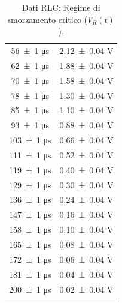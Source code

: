 \documentclass[a4paper]{article}
\begin{document}
\begin{appendices}
\begin{table}[htbp]
\begin{tabular}{|c|c|}
    \num{56 \pm 1} \si{\micro\second} & \num{2.12 \pm 0.04} \si{\volt} \\
    \num{62 \pm 1} \si{\micro\second} & \num{1.88 \pm 0.04} \si{\volt} \\
    \num{70 \pm 1} \si{\micro\second} & \num{1.58 \pm 0.04} \si{\volt} \\
    \num{78 \pm 1} \si{\micro\second} & \num{1.30 \pm 0.04} \si{\volt} \\
    \num{85 \pm 1} \si{\micro\second} & \num{1.10 \pm 0.04} \si{\volt} \\
    \num{93 \pm 1} \si{\micro\second} & \num{0.88 \pm 0.04} \si{\volt} \\ %
    \num{103 \pm 1} \si{\micro\second} & \num{0.66 \pm 0.04} \si{\volt} \\ %
    \num{111 \pm 1} \si{\micro\second} & \num{0.52 \pm 0.04} \si{\volt} \\ %
    \num{119 \pm 1} \si{\micro\second} & \num{0.40 \pm 0.04} \si{\volt} \\ %
    \num{129 \pm 1} \si{\micro\second} & \num{0.30 \pm 0.04} \si{\volt} \\ %
    \num{136 \pm 1} \si{\micro\second} & \num{0.24 \pm 0.04} \si{\volt} \\ %
    \num{147 \pm 1} \si{\micro\second} & \num{0.16 \pm 0.04} \si{\volt} \\ %
    \num{158 \pm 1} \si{\micro\second} & \num{0.10 \pm 0.04} \si{\volt} \\ %
    \num{165 \pm 1} \si{\micro\second} & \num{0.08 \pm 0.04} \si{\volt} \\ %
    \num{172 \pm 1} \si{\micro\second} & \num{0.06 \pm 0.04} \si{\volt} \\ %
    \num{181 \pm 1} \si{\micro\second} & \num{0.04 \pm 0.04} \si{\volt} \\ %
    \num{200 \pm 1} \si{\micro\second} & \num{0.02 \pm 0.04} \si{\volt} \\ %
    \hline
    \end{tabular}
    \caption{Dati RLC: Regime di smorzamento critico ($V_R(t)$).}
    \label{tab:rlc_data_critico}
\end{table}

\end{appendices}
\end{document}
